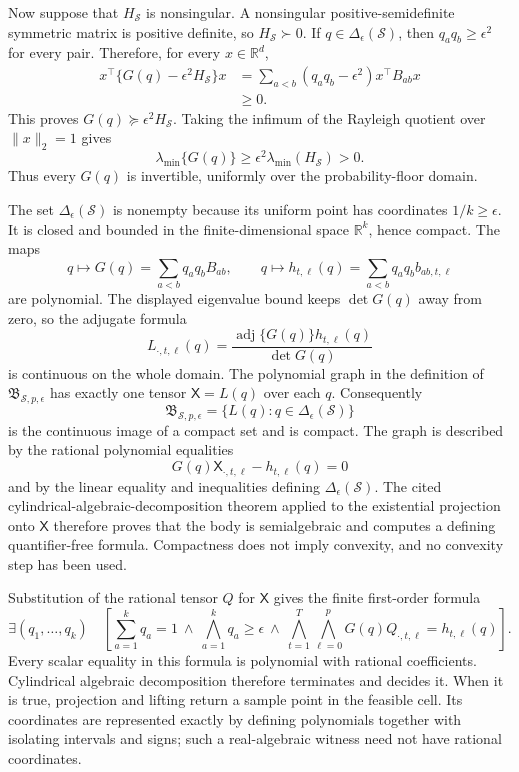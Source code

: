 Now suppose that \(H_{\mathcal S}\) is nonsingular.  A nonsingular positive-semidefinite symmetric matrix is positive definite, so \(H_{\mathcal S}\succ0\).  If \(q\in\Delta_{\epsilon}(\mathcal S)\), then \(q_aq_b\geq\epsilon^2\) for every pair.  Therefore, for every \(x\in\mathbb R^d\),
\[
\begin{aligned}
 x^{\top}\{G(q)-\epsilon^2H_{\mathcal S}\}x
 &=\sum_{a<b}(q_aq_b-\epsilon^2)x^{\top}B_{ab}x\\
 &\geq0.
\end{aligned}
\]
This proves \(G(q)\succeq\epsilon^2H_{\mathcal S}\).  Taking the infimum of the Rayleigh quotient over \(\lVert x\rVert_2=1\) gives
\[
 \lambda_{\min}\{G(q)\}
 \geq\epsilon^2\lambda_{\min}(H_{\mathcal S})>0.
\]
Thus every \(G(q)\) is invertible, uniformly over the probability-floor domain.

The set \(\Delta_{\epsilon}(\mathcal S)\) is nonempty because its uniform point has coordinates \(1/k\geq\epsilon\).  It is closed and bounded in the finite-dimensional space \(\mathbb R^k\), hence compact.  The maps
\[
 q\longmapsto G(q)=\sum_{a<b}q_aq_bB_{ab},
 \qquad
 q\longmapsto h_{t,\ell}(q)=\sum_{a<b}q_aq_bb_{ab,t,\ell}
\]
are polynomial.  The displayed eigenvalue bound keeps \(\det G(q)\) away from zero, so the adjugate formula
\[
 L_{\cdot,t,\ell}(q)
 =\frac{\operatorname{adj}\{G(q)\}h_{t,\ell}(q)}{\det G(q)}
\]
is continuous on the whole domain.  The polynomial graph in the definition of \(\mathfrak B_{\mathcal S,p,\epsilon}\) has exactly one tensor \(\mathsf X=L(q)\) over each \(q\).  Consequently
\[
 \mathfrak B_{\mathcal S,p,\epsilon}
 =\{L(q):q\in\Delta_{\epsilon}(\mathcal S)\}
\]
is the continuous image of a compact set and is compact.  The graph is described by the rational polynomial equalities
\[
 G(q)\mathsf X_{\cdot,t,\ell}-h_{t,\ell}(q)=0
\]
and by the linear equality and inequalities defining \(\Delta_{\epsilon}(\mathcal S)\).  The cited cylindrical-algebraic-decomposition theorem applied to the existential projection onto \(\mathsf X\) therefore proves that the body is semialgebraic and computes a defining quantifier-free formula.  Compactness does not imply convexity, and no convexity step has been used.

Substitution of the rational tensor \(Q\) for \(\mathsf X\) gives the finite first-order formula
\[
 \exists(q_1,\ldots,q_k)\quad
 \left[
   \sum_{a=1}^kq_a=1
   \ \wedge\ 
   \bigwedge_{a=1}^k q_a\geq\epsilon
   \ \wedge\ 
   \bigwedge_{t=1}^T\bigwedge_{\ell=0}^p
   G(q)Q_{\cdot,t,\ell}=h_{t,\ell}(q)
 \right].
\]
Every scalar equality in this formula is polynomial with rational coefficients.  Cylindrical algebraic decomposition therefore terminates and decides it.  When it is true, projection and lifting return a sample point in the feasible cell.  Its coordinates are represented exactly by defining polynomials together with isolating intervals and signs; such a real-algebraic witness need not have rational coordinates.

